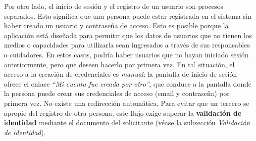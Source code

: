 \documentclass[a4paper,12pt]{article}
\begin{document}
    \par Por otro lado, el inicio de sesión y el registro de un usuario son procesos separados. Esto significa que una persona puede estar registrada en el sistema sin haber creado un usuario y contraseña de acceso. Esto es posible porque la aplicación está diseñada para permitir que los datos de usuarios que no tienen los medios o capacidades para utilizarla sean ingresados a través de sus responsables o cuidadores. En estos casos, podría haber usuarios que no hayan iniciado sesión anteriormente, pero que deseen hacerlo por primera vez. En tal situación, el acceso a la creación de credenciales es \textit{manual}: la pantalla de inicio de sesión ofrece el enlace \textit{``Mi cuenta fue creada por otro''}, que conduce a la pantalla donde la persona puede crear sus credenciales de acceso (email y contraseña) por primera vez. No existe una redirección automática. Para evitar que un tercero se apropie del registro de otra persona, este flujo exige superar la \textbf{validación de identidad} mediante el documento del solicitante (véase la subsección \textit{Validación de identidad}).
\end{document}

